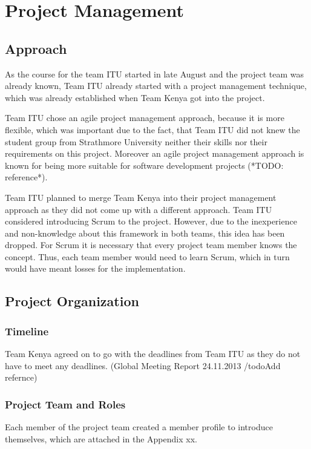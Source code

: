 
\section{Project Management}

\subsection{Approach}

As the course for the team ITU started in late August and the project team was already known, Team ITU already started with a project management technique, which was already established when Team Kenya got into the project.

Team ITU chose an agile project management approach, because it is more flexible, which was important due to the fact, that Team ITU did not knew the student group from Strathmore University neither their skills nor their requirements on this project. Moreover an agile project management approach is known for being more suitable for software development projects (*TODO: reference*).

Team ITU planned to merge Team Kenya into their project management approach as they did not come up with a different approach. Team ITU considered introducing Scrum to the project. However, due to the inexperience and non-knowledge about this framework in both teams, this idea has been dropped. For Scrum it is necessary that every project team member knows the concept. Thus, each team member would need to learn Scrum, which in turn would have meant losses for the implementation.


\subsection{Project Organization}

\subsubsection{Timeline}
Team Kenya agreed on to go with the deadlines from Team ITU as they do not have to meet any deadlines. (Global Meeting Report 24.11.2013 /todo{Add refernce})

\subsubsection{Project Team and Roles}
Each member of the project team created a member profile to introduce themselves, which are attached in the Appendix xx.

